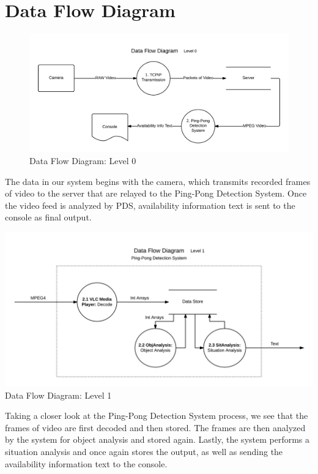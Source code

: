 \documentclass[11pt]{report}
\begin{document}
\newpage
\section{Data Flow Diagram}
\begin{figure}[!htb]
\centering
\includegraphics[width=1\textwidth]{Data-Flow-Level0.png}
\caption{ \small{Data Flow Diagram: Level 0}}
\end{figure}
The data in our system begins with the camera, which transmits recorded frames of video to the server that are relayed to the Ping-Pong Detection System. Once the video feed is analyzed by PDS, availability information text is sent to the console as final output.
\begin{center}
\includegraphics[width=1\textwidth]{Data-Flow-Level1.png}
\small{Data Flow Diagram: Level 1}
\end{center}
Taking a closer look at the Ping-Pong Detection System process, we see that the frames of video are first decoded and then stored. The frames are then analyzed by the system for object analysis and stored again. Lastly, the system performs a situation analysis and once again stores the output, as well as sending the availability information text to the console.
\end{document}

